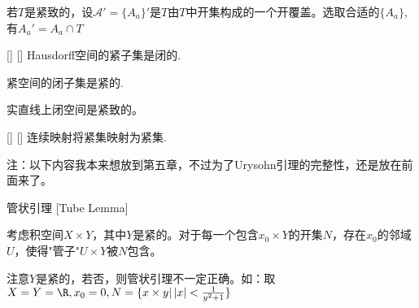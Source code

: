 \documentclass[UTF8]{ctexart}
\begin{document}
            \begin{prf}
                若\(T\)是紧致的，设\(\mathcal{A}'=\{A_{a}\} '\)是\(T\)由\(T\)中开集构成的一个开覆盖。选取合适的\(\{A_{a}\}\),有\(A_{a}'=A_{a}\cap T\)
            \end{prf}

            \begin{ppt}
                []
                {}
                []
                []
                Hausdorff空间的紧子集是闭的. 
                
                紧空间的闭子集是紧的.

                实直线上闭空间是紧致的。
            \end{ppt}
            
            \begin{ppt}
                []
                {}
                []
                []
                连续映射将紧集映射为紧集. 
            \end{ppt}

            注：以下内容我本来想放到第五章，不过为了Urysohn引理的完整性，还是放在前面来了。

            \begin{thm}
                {管状引理}
                [Tube Lemma]

                考虑积空间\(X\times Y\)，其中\(Y\)是紧的。对于每一个包含\(x_0\times Y\)的开集\(N\)，存在\(x_0\)的邻域\(U\)，使得"管子"\(U\times Y\)被\(N\)包含。

                注意\(Y\)是紧的，若否，则管状引理不一定正确。如：取\(X=Y=\R,x_0=0,N=\{x\times y|\left|x\right|<\frac{1}{y^2+1}\}\)
            \end{thm}
\end{document}
